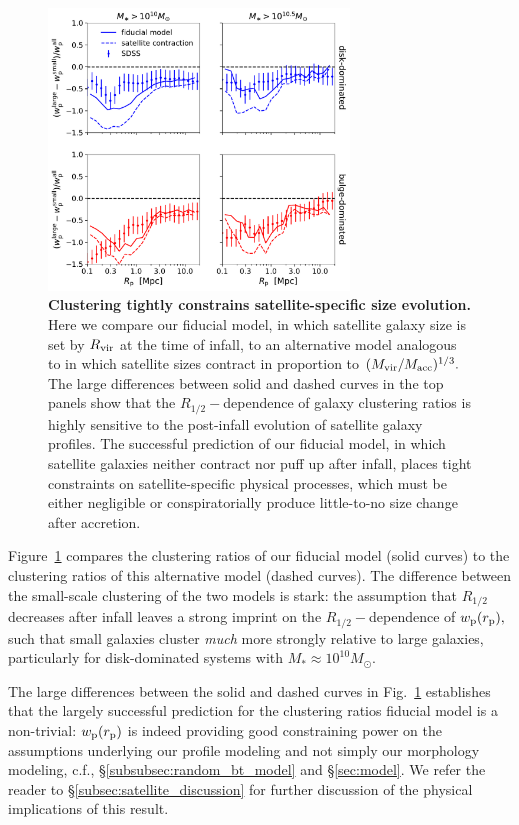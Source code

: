 \documentclass[usenatbib,usegraphicx,letterpaper]{mn2e}
\newcommand{\rhalf}{R_{1/2}}
\newcommand{\rvir}{R_{\rm vir}}
\newcommand{\mstar}{M_{\ast}}
\newcommand{\mvir}{M_{\rm vir}}
\newcommand{\macc}{M_{\rm acc}}
\newcommand{\rproj}{r_{\rm p}}
\newcommand{\wproj}{w_{\rm p}}
\newcommand{\msun}{M_\odot}
\begin{document}
\begin{figure}
\centering
\includegraphics[width=8cm]{FIGS/alternate_satellite_models_size_clustering_ratios.pdf}
\caption{
{\bf Clustering tightly constrains satellite-specific size evolution.}
Here we compare our fiducial model, in which satellite galaxy size is set by $\rvir$ at the time of infall, to an alternative model analogous to \citet{watson_etal12} in which satellite sizes contract in proportion to $(\mvir/\macc)^{1/3}.$ The large differences between solid and dashed curves in the top panels show that the $\rhalf-$dependence of galaxy clustering ratios is highly sensitive to the post-infall evolution of satellite galaxy profiles. The successful prediction of our fiducial model, in which satellite galaxies neither contract nor puff up after infall, places tight constraints on satellite-specific physical processes, which must be either negligible or conspiratorially produce little-to-no size change after accretion.
}
\label{fig:satellites}
\end{figure}

Figure~\ref{fig:satellites} compares the clustering ratios of our fiducial model (solid curves) to the clustering ratios of this alternative model (dashed curves). The difference between the small-scale clustering of the two models is stark: the assumption that $\rhalf$ decreases after infall leaves a strong imprint on the $\rhalf-$dependence of $\wproj(\rproj),$ such that small galaxies cluster {\em much} more strongly relative to large galaxies, particularly for disk-dominated systems with $\mstar\approx10^{10}\msun.$

The large differences between the solid and dashed curves in Fig.~\ref{fig:satellites} establishes that the largely successful prediction for the clustering ratios fiducial model is a non-trivial: $\wproj(\rproj)$ is indeed providing good constraining power on the  assumptions underlying our profile modeling and not simply our morphology modeling, c.f., \S\ref{subsubsec:random_bt_model} and \S\ref{sec:model}. We refer the reader to \S\ref{subsec:satellite_discussion} for further discussion of the physical implications of this result.
\end{document}
